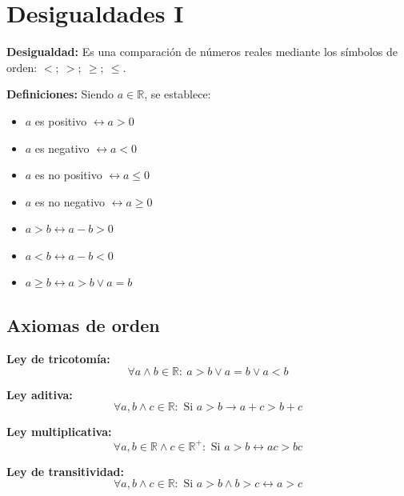 \documentclass[11pt,a4paper]{article}
\newcommand{\cn}[1]{\raisebox{.5pt}{\textcircled{\raisebox{-.9pt}{\scriptsize #1}}}}
\begin{document}
\newpage
\section{Desigualdades I}

\textbf{Desigualdad:} Es una comparación de números reales mediante los símbolos de orden:
$<;\ >;\ \geq;\ \leq$.

\textbf{Definiciones:} Siendo $a \in \mathbb{R}$, se establece:

\begin{minipage}[t]{0.485\textwidth}
\begin{itemize}[label=\textcolor{naranja}{\checkmark}]
  \item $a$ es positivo $\longleftrightarrow a > 0$
  \item $a$ es negativo $\longleftrightarrow a < 0$
  \item $a$ es no positivo $\longleftrightarrow a \leq 0$
  \item $a$ es no negativo $\longleftrightarrow a \geq 0$
\end{itemize}
\end{minipage}\hfill
\begin{minipage}[t]{0.485\textwidth}
\begin{itemize}[label=\textcolor{naranja}{\checkmark}]
  \item $a > b \longleftrightarrow a - b > 0$
  \item $a < b \longleftrightarrow a - b < 0$
  \item $a \geq b \longleftrightarrow a > b \vee a = b$
\end{itemize}
\end{minipage}

\subsection*{Axiomas de orden}

\begin{minipage}[t]{0.485\textwidth}
\cn{1} \textcolor{verde}{\textbf{Ley de tricotomía:}}
\[\forall a \wedge b \in \mathbb{R}:\ a > b \vee a = b \vee a < b\]

\cn{2} \textcolor{verde}{\textbf{Ley aditiva:}}
\[\forall a, b \wedge c \in \mathbb{R}: \text{ Si } a > b \rightarrow a + c > b + c\]
\end{minipage}\hfill
\begin{minipage}[t]{0.485\textwidth}
\cn{3} \textcolor{verde}{\textbf{Ley multiplicativa:}}
\[\forall a, b \in \mathbb{R} \wedge c \in \mathbb{R}^+: \text{ Si } a > b \leftrightarrow ac > bc\]

\cn{4} \textcolor{verde}{\textbf{Ley de transitividad:}}
\[\forall a, b \wedge c \in \mathbb{R}: \text{ Si } a > b \wedge b > c \leftrightarrow a > c\]
\end{minipage}
\end{document}
